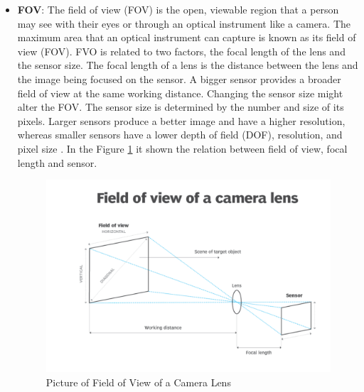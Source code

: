 \begin{itemize}
    \item  \textbf{FOV}: The field of view (FOV) is the open, viewable region that a person may see with their eyes or through an optical instrument like a camera. The maximum area that an optical instrument can capture is known as its field of view (FOV). FVO is related to two factors, the focal length of the lens and the sensor size. The focal length of a lens is the distance between the lens and the image being focused on the sensor. A bigger sensor provides a broader field of view at the same working distance. Changing the sensor size might alter the FOV. The sensor size is determined by the number and size of its pixels. Larger sensors produce a better image and have a higher resolution, whereas smaller sensors have a lower depth of field (DOF), resolution, and pixel size \cite{FOV,Fov}. In the Figure \ref{fig:Field of View of a Camera Lens} it shown the relation between field of view, focal length and sensor. 

 \begin{figure}[H]
  \centering
  \includegraphics[width= 1.1\textwidth]{Figures/Field of View.PNG}
  \caption[Picture of Field of View of a Camera Lens]{Picture of Field of View of a Camera Lens \cite{FOV}}
  \label{fig:Field of View of a Camera Lens}
\end{figure}


\end{itemize}
